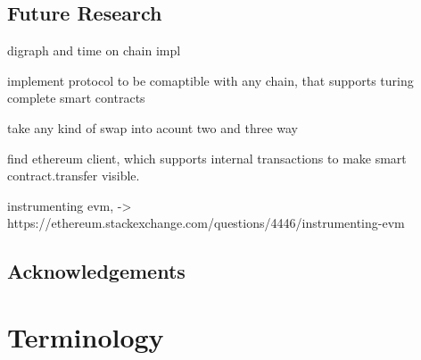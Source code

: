 \section{Future Research}
\label{sec:background:futureresearch}

digraph and time on chain impl

implement protocol to be comaptible with any chain, that supports turing complete smart contracts

take any kind of swap into acount two and three way

find ethereum client, which supports internal transactions to make smart contract.transfer visible.

instrumenting evm, -> https://ethereum.stackexchange.com/questions/4446/instrumenting-evm

\section{Acknowledgements}
\label{sec:background:acknowledgements}


\chapter{Terminology}
\label{ch:chapter06}


